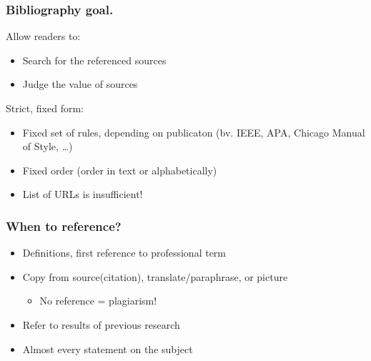 \documentclass[aspectratio=169]{beamer}
\begin{document}
    
    \begin{frame}[plain]
        \frametitle{Bibliography goal.}
        
        Allow readers to:
        
        \begin{itemize}
            \item Search for the referenced sources
            \item Judge the value of sources
        \end{itemize}
        
        {\pause}
        
        Strict, fixed form:
        
        \begin{itemize}
            \item Fixed set of rules, depending on publicaton (bv. IEEE, APA, Chicago Manual of Style, \ldots)
            \item Fixed order (order in text or alphabetically)
            \item List of URLs is insufficient!
        \end{itemize}
        
        {\pause}
        
    \end{frame}
    
    \begin{frame}
        \frametitle{When to reference?}
        
        \begin{itemize}
            \item Definitions, first reference to professional term
            \item Copy from source(citation), translate/paraphrase, or picture
            \begin{itemize}
                \item No reference = \alert{plagiarism!}
            \end{itemize}
            \item Refer to results of previous research 
            \item Almost every statement on the subject
        \end{itemize}
        
        \bigskip
        
    \end{frame}
    
\end{document}
